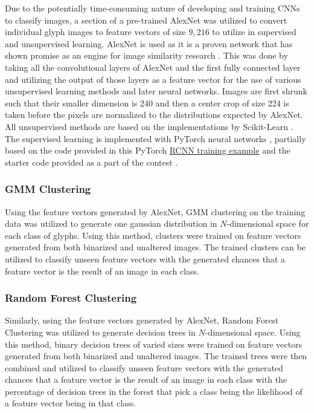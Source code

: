 Due to the potentially time-consuming nature of developing and training CNNs to classify images, a section of a pre-trained AlexNet \cite{Krizhevsky} was utilized to convert individual glyph images to feature vectors of size $9,216$ to utilize in supervised and unsupervised learning. AlexNet is used as it is a proven network that has shown promise as an engine for image similarity research \cite{Vadicamo, Yuan}. This was done by taking all the convolutional layers of AlexNet and the first fully connected layer and utilizing the output of those layers as a feature vector for the use of various unsupervised learning methods and later neural networks. Images are first shrunk such that their smaller dimension is 240 and then a center crop of size 224 is taken before the pixels are normalized to the distributions expected by AlexNet. All unsupervised methods are based on the implementations by Scikit-Learn \cite{Scikit}. The supervised learning is implemented with PyTorch neural networks \cite{PyTorch}, partially based on the code provided in this PyTorch \href{https://pytorch.org/tutorials/intermediate/torchvision\_tutorial.html}{RCNN training example} and the starter code provided as a part of the contest \cite{Contest}.

\subsubsection{GMM Clustering}

Using the feature vectors generated by AlexNet, GMM clustering on the training data was utilized to generate one gaussian distribution in $N$-dimensional space for each class of glyphs. Using this method, clusters were trained on feature vectors generated from both binarized and unaltered images. The trained clusters can be utilized to classify unseen feature vectors with the generated chances that a feature vector is the result of an image in each class.

\subsubsection{Random Forest Clustering}

Similarly, using the feature vectors generated by AlexNet, Random Forest Clustering was utilized to generate decision trees in $N$-dimensional space. Using this method, binary decision trees of varied sizes were trained on feature vectors generated from both binarized and unaltered images. The trained trees were then combined and utilized to classify unseen feature vectors with the generated chances that a feature vector is the result of an image in each class with the percentage of decision trees in the forest that pick a class being the likelihood of a feature vector being in that class.

